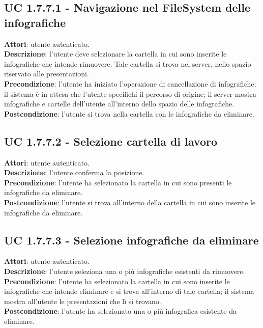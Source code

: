 		\subsection{UC 1.7.7.1 - Navigazione nel FileSystem delle infografiche}{
			\label{uc1.7.7.1}
			\textbf{Attori}: utente autenticato. \\
			\textbf{Descrizione}: l'utente deve selezionare la cartella in cui sono inserite le infografiche che intende rimuovere. Tale cartella si trova nel server, nello spazio riservato alle presentazioni. \\
			\textbf{Precondizione}: l'utente ha iniziato l'operazione di cancellazione di infografiche; il sistema è in attesa che l'utente specifichi il percorso di origine; il server mostra infografiche e cartelle dell'utente all'interno dello spazio delle infografiche.	\\
			\textbf{Postcondizione}: l'utente si trova nella cartella con le infografiche da eliminare.	\\
			}
		\subsection{UC 1.7.7.2 - Selezione cartella di lavoro}{
			\label{uc1.7.7.2}
			\textbf{Attori}: utente autenticato. \\
			\textbf{Descrizione}: l'utente conferma la posizione. \\
			\textbf{Precondizione}: l'utente ha selezionato la cartella in cui sono presenti le infografiche da eliminare.	\\
			\textbf{Postcondizione}: l'utente si trova all'interno della cartella in cui sono inserite le infografiche da eliminare. 	\\
			}
		\subsection{UC 1.7.7.3 - Selezione infografiche da eliminare}{
			\label{uc1.7.7.3}
			\textbf{Attori}: utente autenticato. \\
			\textbf{Descrizione}: l'utente seleziona una o più infografiche esistenti da rimuovere. \\
			\textbf{Precondizione}: l'utente ha selezionato la cartella in cui sono  inserite le infografiche che intende eliminare e si trova all'interno di tale cartella; il sistema mostra all'utente le presentazioni che lì si trovano.	\\
			\textbf{Postcondizione}: l'utente ha selezionato una o più infografica esistente da eliminare.	\\
			}
